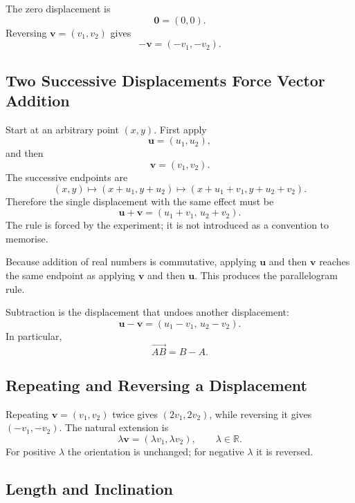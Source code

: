 The zero displacement is
\[
\mathbf0=(0,0).
\]
Reversing $\mathbf v=(v_1,v_2)$ gives
\[
-\mathbf v=(-v_1,-v_2).
\]

\subsection{Two Successive Displacements Force Vector Addition}

Start at an arbitrary point $(x,y)$. First apply
\[
\mathbf u=(u_1,u_2),
\]
and then
\[
\mathbf v=(v_1,v_2).
\]
The successive endpoints are
\[
(x,y)
\longmapsto
(x+u_1,y+u_2)
\longmapsto
(x+u_1+v_1,y+u_2+v_2).
\]
Therefore the single displacement with the same effect must be
\[
\mathbf u+\mathbf v
=
(u_1+v_1,\,u_2+v_2).
\]
The rule is forced by the experiment; it is not introduced as a convention to
memorise.

Because addition of real numbers is commutative, applying $\mathbf u$ and then
$\mathbf v$ reaches the same endpoint as applying $\mathbf v$ and then
$\mathbf u$. This produces the parallelogram rule.

\begin{center}
\end{center}

Subtraction is the displacement that undoes another displacement:
\[
\mathbf u-\mathbf v
=
(u_1-v_1,\,u_2-v_2).
\]
In particular,
\[
\overrightarrow{AB}=B-A.
\]

\subsection{Repeating and Reversing a Displacement}

Repeating $\mathbf v=(v_1,v_2)$ twice gives $(2v_1,2v_2)$, while reversing it
gives $(-v_1,-v_2)$. The natural extension is
\[
\lambda\mathbf v=(\lambda v_1,\lambda v_2),
\qquad \lambda\in\mathbb R.
\]
For positive $\lambda$ the orientation is unchanged; for negative $\lambda$ it
is reversed.

\subsection{Length and Inclination}

